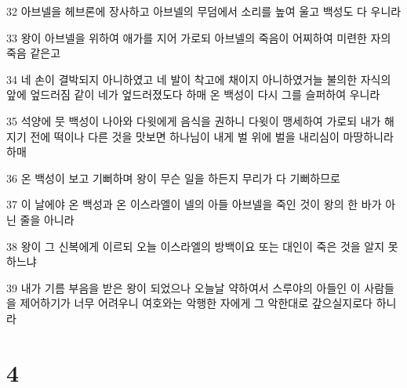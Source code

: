 \par 32 아브넬을 헤브론에 장사하고 아브넬의 무덤에서 소리를 높여 울고 백성도 다 우니라
\par 33 왕이 아브넬을 위하여 애가를 지어 가로되 아브넬의 죽음이 어찌하여 미련한 자의 죽음 같은고
\par 34 네 손이 결박되지 아니하였고 네 발이 착고에 채이지 아니하였거늘 불의한 자식의 앞에 엎드러짐 같이 네가 엎드러졌도다 하매 온 백성이 다시 그를 슬퍼하여 우니라
\par 35 석양에 뭇 백성이 나아와 다윗에게 음식을 권하니 다윗이 맹세하여 가로되 내가 해지기 전에 떡이나 다른 것을 맛보면 하나님이 내게 벌 위에 벌을 내리심이 마땅하니라 하매
\par 36 온 백성이 보고 기뻐하며 왕이 무슨 일을 하든지 무리가 다 기뻐하므로
\par 37 이 날에야 온 백성과 온 이스라엘이 넬의 아들 아브넬을 죽인 것이 왕의 한 바가 아닌 줄을 아니라
\par 38 왕이 그 신복에게 이르되 오늘 이스라엘의 방백이요 또는 대인이 죽은 것을 알지 못하느냐
\par 39 내가 기름 부음을 받은 왕이 되었으나 오늘날 약하여서 스루야의 아들인 이 사람들을 제어하기가 너무 어려우니 여호와는 악행한 자에게 그 악한대로 갚으실지로다 하니라

\chapter{4}


